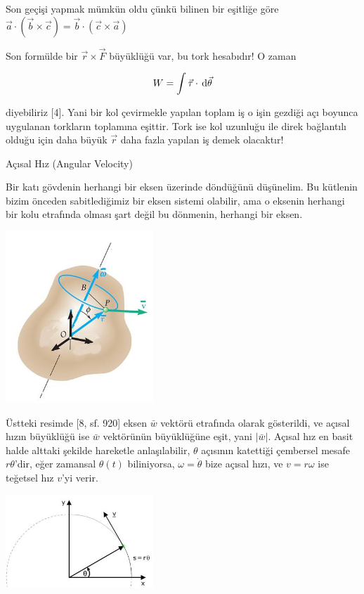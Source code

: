 \documentclass[12pt,fleqn]{article}\usepackage{../../common}
\begin{document}
Son geçişi yapmak mümkün oldu çünkü bilinen bir eşitliğe göre
$\vec{a} \cdot (\vec{b} \times \vec{c}) = \vec{b} \cdot (\vec{c} \times \vec{a})$

Son formülde bir $\vec{r}  \times \vec{F}$ büyüklüğü var, bu tork hesabıdır! O
zaman

$$
W = \int  \vec{\tau} \cdot \,\mathrm{d} \vec{\theta}
$$

diyebiliriz [4]. Yani bir kol çevirmekle yapılan toplam iş o işin gezdiği
açı boyunca uygulanan torkların toplamına eşittir. Tork ise kol uzunluğu
ile direk bağlantılı olduğu için daha büyük $\vec{r}$ daha fazla yapılan
iş demek olacaktır!

Açısal Hız (Angular Velocity)

Bir katı gövdenin herhangi bir eksen üzerinde döndüğünü düşünelim.  Bu kütlenin
bizim önceden sabitlediğimiz bir eksen sistemi olabilir, ama o eksenin herhangi
bir kolu etrafında olması şart değil bu dönmenin, herhangi bir eksen.

\includegraphics[width=15em]{phy_005_basics_02_14.jpg}

Üstteki resimde [8, sf. 920] eksen $\bar{w}$ vektörü etrafında olarak
gösterildi, ve açısal hızın büyüklüğü ise $\bar{w}$ vektörünün büyüklüğüne eşit,
yani $|\bar{w}|$.  Açısal hız en basit halde alttaki şekilde hareketle
anlaşılabilir, $\theta$ açısının katettiği çembersel mesafe $r\theta$'dir, eğer
zamansal $\theta(t)$ biliniyorsa, $\omega = \dot{\theta}$ bize açısal hızı, ve
$v = r\omega$ ise teğetsel hız $v$'yi verir.

\includegraphics[width=15em]{phy_005_basics_02_15.jpg}
\end{document}
